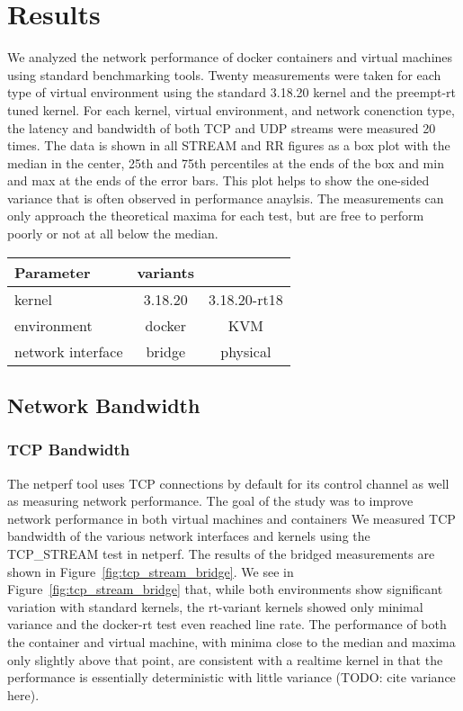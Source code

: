 \chapter{Results}
\label{cha:results}
\label{sec:results}
We analyzed the network performance of docker containers and virtual machines using standard benchmarking tools.  
Twenty measurements were taken for each type of virtual environment using the standard 3.18.20 kernel and the preempt-rt tuned kernel.
For each kernel, virtual environment, and network conenction type, the latency and bandwidth of both TCP and UDP streams were measured 20 times.
The data is shown in all STREAM and RR figures as a box plot with the median in the center, 25th and 75th percentiles at the ends of the box and min and max at the ends of the error bars.
This plot helps to show the one-sided variance that is often observed in performance anaylsis.  
The measurements can only approach the theoretical maxima for each test, but are free to perform poorly or not at all below the median.  

\begin{table}[ht!]
    \centering
    \begin{tabular}{|l|c|c|}
    \hline
    Parameter & variants & \\
    \hline \hline
    kernel & 3.18.20 & 3.18.20-rt18 \\ 
    environment & docker & KVM \\ 
    network interface & bridge & physical \\ 
    \hline
    \end{tabular}
\end{table}

\section{Network Bandwidth} %
\label{sec:networkbandwidth}
\subsection{TCP Bandwidth} %
\label{sub:tcpbandwidth}
The netperf tool uses TCP connections by default for its control channel as well as measuring network performance. 
    The goal of the study was to improve network performance in both virtual machines and containers 
We measured TCP bandwidth of the various network interfaces and kernels using the TCP\_STREAM test in netperf.
The results of the bridged measurements are shown in Figure~\ref{fig:tcp_stream_bridge}.
We see in Figure~\ref{fig:tcp_stream_bridge} that, while both environments show significant variation with standard kernels, the rt-variant kernels showed only minimal variance and the docker-rt test even reached line rate.  
The performance of both the container and virtual machine, with minima close to the median and maxima only slightly above that point, are consistent with a realtime kernel in that the performance is essentially deterministic with little variance (TODO: cite variance here).


